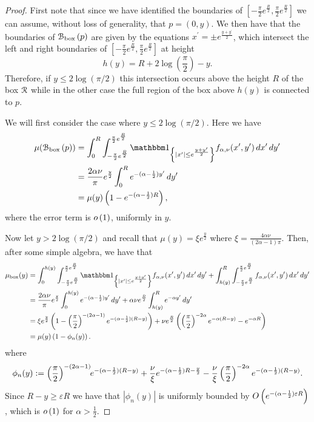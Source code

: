 \begin{proof}
First note that since we have identified the boundaries of $[-\frac{\pi}{2}e^{\frac{R}{2}}, \frac{\pi}{2}e^{\frac{R}{2}}]$ we can assume, without loss of generality, that $p = (0,y)$. We then have that the boundaries of ${\mathcal B}_{\text{box}}\left(p\right)$ are given by the equations $x^\prime = \pm e^{\frac{y+y^\prime}{2}}$, which intersect the left and right boundaries of $[-\frac{\pi}{2}e^{\frac{R}{2}}, \frac{\pi}{2}e^{\frac{R}{2}}]$ at height
\[
	h(y) = R + 2 \log\left(\frac{\pi}{2}\right) - y.
\]
Therefore, if $y \le 2 \log(\pi/2)$ this intersection occurs above the height $R$ of the box ${\mathcal R}$ while in the other case the full region of the box above $h(y)$ is connected to $p$. 

We will first consider the case where $y \le 2 \log(\pi/2)$. Here we have
\begin{align*}
	\mu(\BallPon{p})
	&= \int_0^{R} \int_{-\frac{\pi}{2}e^{\frac{R}{2}}}^{\frac{\pi}{2}e^{\frac{R}{2}}} 
		\ind{|x^\prime| \le e^{\frac{y+y^\prime}{2}}} f_{\alpha,\nu}(x^\prime,y^\prime) \, dx^\prime \, dy^\prime\\
	&= \frac{2 \alpha \nu}{\pi} e^{\frac{y}{2}} \int_0^{R} e^{-(\alpha - \frac{1}{2})y^\prime} \, dy^\prime\\
	&= \mu(y)\left(1 - e^{-(\alpha - \frac{1}{2})R}\right),
\end{align*}
where the error term is $o\left(1\right)$, uniformly in $y$.

Now let $y > 2 \log(\pi/2)$ and recall that $\mu(y) = \xi e^{\frac{y}{2}}$ where $\xi = \frac{4\alpha \nu}{(2\alpha - 1)\pi}$. Then, after some simple algebra, we have that
\begin{align*}
	\mu_{\mathrm{box}}(y)
	&= \int_0^{h(y)} \int_{-\frac{\pi}{2}e^{\frac{R}{2}}}^{\frac{\pi}{2}e^{\frac{R}{2}}} 
		\ind{|x^\prime| \le e^{\frac{y+y^\prime}{2}}} f_{\alpha,\nu}(x^\prime,y^\prime) \, dx^\prime \, dy^\prime
		+ \int_{h(y)}^{R} \int_{-\frac{\pi}{2}e^{\frac{R}{2}}}^{\frac{\pi}{2}e^{\frac{R}{2}}} 
		f_{\alpha,\nu}(x^\prime,y^\prime) \, dx^\prime \, dy^\prime\\
	&= \frac{2 \alpha \nu}{\pi} e^{\frac{y}{2}} \int_0^{h(y)} e^{-(\alpha - \frac{1}{2})y^\prime} \, dy^\prime
		+ \alpha \nu e^{\frac{R}{2}} \int_{h(y)}^{R} e^{-\alpha y^\prime} \, dy^\prime \\
	&= \xi e^{\frac{y}{2}}\left(1 - \left(\frac{\pi}{2}\right)^{-(2\alpha - 1)} 
		e^{-(\alpha - \frac{1}{2})(R - y)}\right)
	+ \nu e^{\frac{R}{2}}\left(\left(\frac{\pi}{2}\right)^{-2\alpha} e^{-\alpha(R - y)} 
		- e^{-\alpha R}\right)\\
	&= \mu(y)\left(1 - \phi_n(y) \right).
\end{align*}
where 
\[
	\phi_n(y) :=  \left(\frac{\pi}{2}\right)^{-(2\alpha - 1)} \hspace{-3pt} e^{-(\alpha - \frac{1}{2})(R - y)}
				+ \frac{\nu}{\xi}e^{-(\alpha - \frac{1}{2})R - \frac{y}{2}} - \frac{\nu}{\xi}\left(\frac{\pi}{2}\right)^{-2\alpha} e^{-(\alpha-\frac{1}{2})(R - y)}.
\]
Since $R - y \ge \varepsilon R$ we have that $|\phi_n(y)|$ is uniformly bounded by
$O\left(e^{-(\alpha - \frac{1}{2})\varepsilon R}\right)$, which is $o\left(1\right)$ for $\alpha > \frac{1}{2}$. 
\end{proof}

